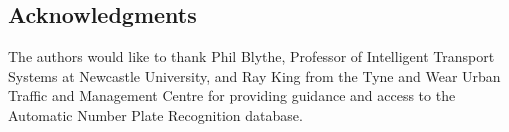 \subsection*{Acknowledgments}

The authors would like to thank Phil Blythe, Professor of Intelligent Transport Systems at Newcastle University, and Ray King from the Tyne and Wear Urban Traffic and Management Centre for providing guidance and access to the Automatic Number Plate Recognition database.
